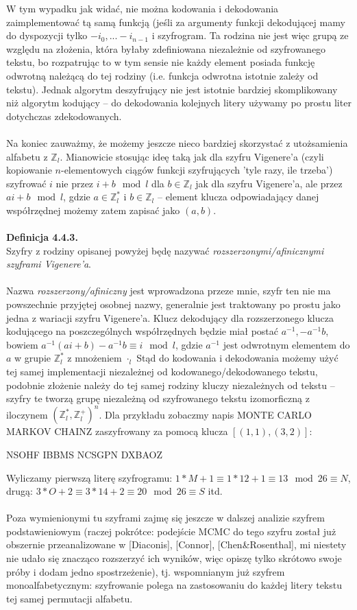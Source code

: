 \documentclass[a4paper]{article}
\begin{document}
W tym wypadku jak widać, nie można kodowania i dekodowania zaimplementować tą samą funkcją (jeśli za argumenty funkcji dekodującej mamy do dyspozycji tylko $-i_0, ... -i_{n-1}$ i szyfrogram. Ta rodzina nie jest więc grupą ze względu na złożenia, która byłaby zdefiniowana niezależnie od szyfrowanego tekstu, bo rozpatrując to w tym sensie nie każdy element posiada funkcję odwrotną należącą do tej rodziny (i.e. funkcja odwrotna istotnie zależy od tekstu). Jednak algorytm deszyfrujący nie jest istotnie bardziej skomplikowany niż algorytm kodujący – do dekodowania kolejnych litery używamy po prostu liter dotychczas zdekodowanych. \\\\
Na koniec zauważmy, że możemy jeszcze nieco bardziej skorzystać z utożsamienia alfabetu z $\mathbb{Z}_l$. Mianowicie stosując ideę taką jak dla szyfru Vigenere'a (czyli kopiowanie $n$-elementowych ciągów funkcji szyfrujących 'tyle razy, ile trzeba') szyfrować $i$ nie przez $i+b \mod l$ dla $b \in \mathbb{Z}_l$ jak dla szyfru Vigenere'a, ale przez $ai+b \mod l$, gdzie $a \in \mathbb{Z}_l^*$ i $b \in \mathbb{Z}_l$ – element klucza odpowiadający danej współrzędnej możemy zatem zapisać jako $(a,b)$. \\\\
\textbf{Definicja 4.4.3.}\\
Szyfry z rodziny opisanej powyżej będę nazywać \textit{rozszerzonymi/afinicznymi szyframi Vigenere'a}. \\\\
Nazwa \textit{rozszerzony/afiniczny} jest wprowadzona przeze mnie, szyfr ten nie ma powszechnie przyjętej osobnej nazwy, generalnie jest traktowany po prostu jako jedna z wariacji szyfru Vigenere'a. Klucz dekodujący dla rozszerzonego klucza kodującego na poszczególnych współrzędnych będzie miał postać $a^{-1}, -a^{-1}b$, bowiem $a^{-1}(ai+b) - a^{-1}b \equiv i \mod l$, gdzie $a^{-1}$ jest odwrotnym elementem do $a$ w grupie $\mathbb{Z}_l^*$ z mnożeniem $\cdot_l$ Stąd do kodowania i dekodowania możemy użyć tej samej implementacji niezależnej od kodowanego/dekodowanego tekstu, podobnie złożenie należy do tej samej rodziny kluczy niezależnych od tekstu – szyfry te tworzą grupę niezależną od szyfrowanego tekstu izomorficzną z iloczynem $(\mathbb{Z}_l^*, \mathbb{Z}_l^+)^n$.
Dla przykładu zobaczmy napis MONTE CARLO MARKOV CHAINZ zaszyfrowany za pomocą klucza $[(1,1), (3,2)]$:
\begin{center}
    NSOHF IBBMS NCSGPN DXBAOZ
\end{center}
Wyliczamy pierwszą literę szyfrogramu: $1*M+1 \equiv 1*12+1 \equiv 13 \mod 26 \equiv N$, drugą: $3*O + 2 \equiv 3*14 + 2 \equiv 20 \mod 26 \equiv S$ itd.
\\\\
Poza wymienionymi tu szyframi zajmę się jeszcze w dalszej analizie szyfrem podstawieniowym (raczej pokrótce: podejście MCMC do tego szyfru został już obszernie przeanalizowane w [Diaconis], [Connor], [Chen\&Rosenthal], mi niestety nie udało się znacząco rozszerzyć ich wyników, więc opiszę tylko skrótowo swoje próby i dodam jedno spostrzeżenie), tj. wspomnianym już szyfrem monoalfabetycznym: szyfrowanie polega na zastosowaniu do każdej litery tekstu tej samej permutacji alfabetu.
\end{document}
